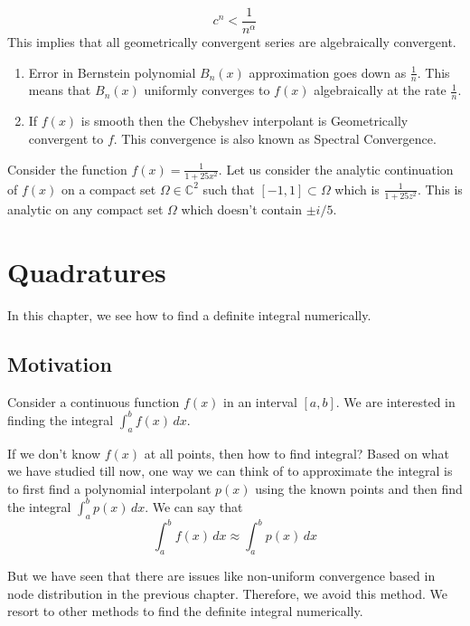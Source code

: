 \documentclass[
]{book}
\begin{document}
\[c^n<\frac{1}{n^{\alpha}}\]
This implies that all geometrically convergent series are algebraically convergent.

\begin{enumerate}
\def\labelenumi{\arabic{enumi}.}
\setcounter{enumi}{3}
\item
  Error in Bernstein polynomial \(B_n(x)\) approximation goes down as \(\frac{1}{n}\). This means that \(B_n(x)\) uniformly converges to \(f(x)\) algebraically at the rate \(\frac{1}{n}\).
\item
  If \(f(x)\) is smooth then the Chebyshev interpolant is Geometrically convergent to \(f\). This convergence is also known as Spectral Convergence.
\end{enumerate}

Consider the function \(f(x) = \frac{1}{1+25x^2}\). Let us consider the analytic continuation of \(f(x)\) on a compact set \(\Omega \in \mathbb{C}^2\) such that \([-1,1] \subset \Omega\) which is \(\frac{1}{1+25z^2}\). This is analytic on any compact set \(\Omega\) which doesn't contain \(\pm i/5\).

\hypertarget{quadratures}{%
\chapter{Quadratures}\label{quadratures}}

In this chapter, we see how to find a definite integral numerically.

\hypertarget{motivation-2}{%
\section{Motivation}\label{motivation-2}}

Consider a continuous function \(f(x)\) in an interval \([a,b]\). We are interested in finding the integral \(\int_a^b f(x)\, dx\).

If we don't know \(f(x)\) at all points, then how to find integral? Based on what we have studied till now, one way we can think of to approximate the integral is to first find a polynomial interpolant \(p(x)\) using the known points and then find the integral \(\int_a^b p(x) \, dx\). We can say that
\begin{equation}
\int_a^b f(x)\, dx \approx \int_a^b p(x) \, dx
\end{equation}

But we have seen that there are issues like non-uniform convergence based in node distribution in the previous chapter. Therefore, we avoid this method. We resort to other methods to find the definite integral numerically.
\end{document}
